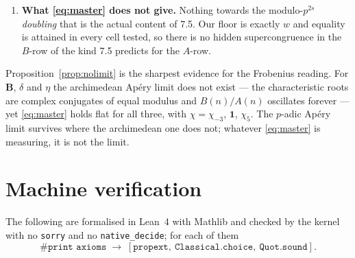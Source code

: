 \documentclass[11pt,reqno]{amsart}
\theoremstyle{plain}
\theoremstyle{definition}
\theoremstyle{remark}
\numberwithin{equation}{section}
\begin{document}
\begin{enumerate}[leftmargin=2em]
  $\chi(p)p^{w}$ and not $p^{w}$, i.e.\ that the family is attached to a
  quadratic-twisted modular parametrisation. \emph{This is a concrete correction to make to
  any ``Dwork crystals $\Rightarrow$ Lucas congruences for the second solution'' slogan.}
  We have not located a second-solution version of \eqref{eq:BV76} in \cite{BVthree}, nor
  elsewhere; we do not claim to have surveyed \cite{BVone,BVtwo} exhaustively.
\item \textbf{What \eqref{eq:master} does not give.} Nothing towards the modulo-$p^{2s}$
  \emph{doubling} that is the actual content of 7.5. Our floor is exactly $w$ and equality
  is attained in every cell tested, so there is no hidden supercongruence in the $B$-row of
  the kind 7.5 predicts for the $A$-row.
\end{enumerate}

Proposition~\ref{prop:nolimit} is the sharpest evidence for the Frobenius reading. For
$\mathbf B$, $\delta$ and $\eta$ the archimedean Ap\'ery limit does not exist --- the
characteristic roots are complex conjugates of equal modulus and $B(n)/A(n)$ oscillates
forever --- yet \eqref{eq:master} holds flat for all three, with $\chi=\chi_{-3}$,
$\mathbf 1$, $\chi_5$. The $p$-adic Ap\'ery limit survives where the archimedean one does
not; whatever \eqref{eq:master} is measuring, it is not the limit.

\section{Machine verification}\label{sec:lean}

The following are formalised in Lean~4 with Mathlib and checked by the kernel with no
\texttt{sorry} and no \texttt{native\_decide}; for each of them
\[
  \texttt{\#print axioms}\;\longrightarrow\;
  [\texttt{propext},\ \texttt{Classical.choice},\ \texttt{Quot.sound}].
\]
\end{document}

